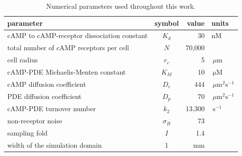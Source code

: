 \documentclass[10pt]{article}
\begin{document}

\begin{table}[ht]
	\centering
	\begin{tabular}{|l|c|r|l|}
		\hline
		parameter & symbol & value & units \\
		\hline\hline
		cAMP to cAMP-receptor dissociation constant & $K_d$ & 30 & nM \\
		\hline
		total number of cAMP receptors per cell & $N$ & 70,000 & \\
		\hline
		cell radius & $r_c$ & 5 & $\,\mu\mathrm{m}$ \\
		\hline
		cAMP-PDE Michaelis-Menten constant & $K_M$ & 10 & $\,\mathrm{\mu M}$ \\
		\hline
		cAMP diffusion coefficient & $D_c$ & 444 & $\,\mu\mathrm{m^2s^{-1}}$ \\
		\hline
		PDE diffusion coefficient & $D_p$ & 70 & $\,\mu\mathrm{m^2s^{-1}}$ \\
		\hline
		cAMP-PDE turnover number & $k_2$ & 13,300 & $\,\mathrm{s^{-1}}$ \\
		\hline
		non-receptor noise & $\sigma_B$ & 73 & \\
		\hline
		sampling fold & $I$ & 1.4 & \\
		\hline
	  width of the simulation domain & 1 & mm & \\
		\hline
	\end{tabular}
	\caption{Numerical parameters used throughout this work.}
\end{table}


%
%

\end{document}
